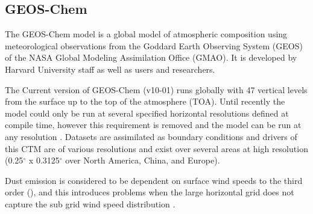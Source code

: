 \subsection{GEOS-Chem}

The GEOS-Chem model is a global model of atmospheric composition using meteorological observations from the Goddard Earth Observing System (GEOS) of the NASA Global Modeling Assimilation Office (GMAO). It is developed by Harvard University staff as well as users and researchers. 

The Current version of GEOS-Chem (v10-01) runs globally with 47 vertical levels from the surface up to the top of the atmosphere (TOA). 
Until recently the model could only be run at several specified horizontal resolutions defined at compile time, however this requirement is removed and the model can be run at any resolution \cite{Long_2015}.
Datasets are assimilated as boundary conditions and drivers of this CTM are of various resolutions and exist over several areas at high resolution (0.25$^{\circ}$ x 0.3125$^{\circ}$ over North America, China, and Europe).

Dust emission is considered to be dependent on surface wind speeds to the third order (\cite{Duncan_Fairlie_2007}), and this introduces problems when the large horizontal grid does not capture the sub grid wind speed distribution \cite{Ridley_2013}.

  
  
  